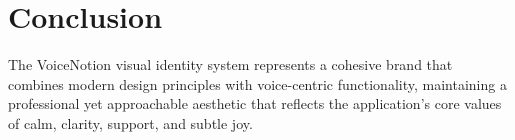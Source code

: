 \section{Conclusion}
The VoiceNotion visual identity system represents a cohesive brand that combines modern design principles with voice-centric functionality, maintaining a professional yet approachable aesthetic that reflects the application's core values of calm, clarity, support, and subtle joy.
